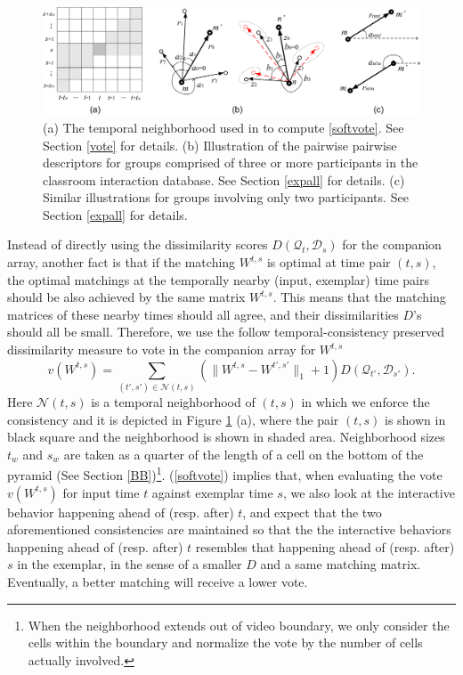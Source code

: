 \begin{figure}[t]
\begin{center}
\includegraphics[scale=1.2]{all_illu.png}
\end{center}
\caption{(a) The temporal neighborhood used in to compute \ref{softvote}. See Section \ref{vote} for details. (b) Illustration of the pairwise pairwise descriptors for groups comprised of three or more participants in the classroom interaction database. See Section \ref{expall} for details. (c) Similar illustrations for groups involving only two participants. See Section \ref{expall} for details.}
\label{all_illu}
\end{figure}

Instead of directly using the dissimilarity scores $D(\mathcal{Q}_{t}, \mathcal{D}_{s})$ for the companion array, another fact is that if the matching $W^{t,s}$ is optimal at time pair $(t,s)$, the optimal matchings at the temporally nearby (input, exemplar) time pairs should be also achieved by the same matrix $W^{t,s}$. This means that the matching matrices of these nearby times should all agree, and their dissimilarities $D$'s should all be small. Therefore, we use the follow temporal-consistency preserved dissimilarity measure to vote in the companion array for $W^{t,s}$
\begin{equation}
\label{softvote}
v(W^{t,s})=\sum_{(t',s')\in\mathcal{N}(t,s)}(\|W^{t,s}-W^{t',s'}\|_{1}+1)D(\mathcal{Q}_{t'}, \mathcal{D}_{s'}).
\end{equation}
Here $\mathcal{N}(t,s)$ is a temporal neighborhood of $(t,s)$ in which we enforce the consistency and it is depicted in Figure \ref{all_illu} (a), where the pair $(t,s)$ is shown in black square and the neighborhood is shown in shaded area. Neighborhood sizes $t_{w}$ and $s_{w}$ are taken as a quarter of the length of a cell on the bottom of the pyramid (See Section \ref{BB})\footnote{When the neighborhood extends out of video boundary, we only consider the cells within the boundary and normalize the vote by the number of cells actually involved.}. (\ref{softvote}) implies that, when evaluating the vote $v(W^{t,s})$ for input time $t$ against exemplar time $s$, we also look at the interactive behavior happening ahead of (resp. after) $t$, and expect that the two aforementioned consistencies are maintained so that the the interactive behaviors happening ahead of (resp. after) $t$ resembles that happening ahead of (resp. after) $s$ in the exemplar, in the sense of a smaller $D$ and a same matching matrix. Eventually, a better matching will receive a lower vote. 

